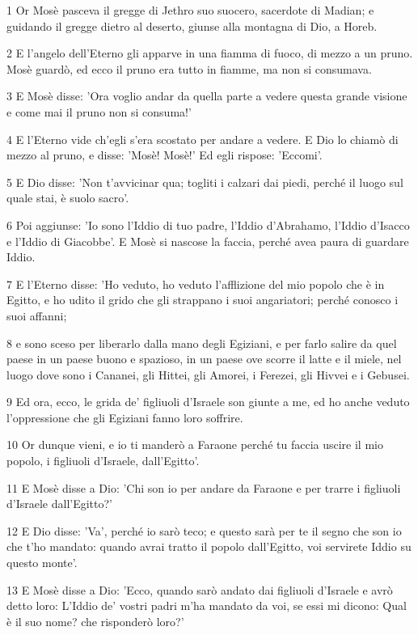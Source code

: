 \par 1 Or Mosè pasceva il gregge di Jethro suo suocero, sacerdote di Madian; e guidando il gregge dietro al deserto, giunse alla montagna di Dio, a Horeb.
\par 2 E l'angelo dell'Eterno gli apparve in una fiamma di fuoco, di mezzo a un pruno. Mosè guardò, ed ecco il pruno era tutto in fiamme, ma non si consumava.
\par 3 E Mosè disse: 'Ora voglio andar da quella parte a vedere questa grande visione e come mai il pruno non si consuma!'
\par 4 E l'Eterno vide ch'egli s'era scostato per andare a vedere. E Dio lo chiamò di mezzo al pruno, e disse: 'Mosè! Mosè!' Ed egli rispose: 'Eccomi'.
\par 5 E Dio disse: 'Non t'avvicinar qua; togliti i calzari dai piedi, perché il luogo sul quale stai, è suolo sacro'.
\par 6 Poi aggiunse: 'Io sono l'Iddio di tuo padre, l'Iddio d'Abrahamo, l'Iddio d'Isacco e l'Iddio di Giacobbe'. E Mosè si nascose la faccia, perché avea paura di guardare Iddio.
\par 7 E l'Eterno disse: 'Ho veduto, ho veduto l'afflizione del mio popolo che è in Egitto, e ho udito il grido che gli strappano i suoi angariatori; perché conosco i suoi affanni;
\par 8 e sono sceso per liberarlo dalla mano degli Egiziani, e per farlo salire da quel paese in un paese buono e spazioso, in un paese ove scorre il latte e il miele, nel luogo dove sono i Cananei, gli Hittei, gli Amorei, i Ferezei, gli Hivvei e i Gebusei.
\par 9 Ed ora, ecco, le grida de' figliuoli d'Israele son giunte a me, ed ho anche veduto l'oppressione che gli Egiziani fanno loro soffrire.
\par 10 Or dunque vieni, e io ti manderò a Faraone perché tu faccia uscire il mio popolo, i figliuoli d'Israele, dall'Egitto'.
\par 11 E Mosè disse a Dio: 'Chi son io per andare da Faraone e per trarre i figliuoli d'Israele dall'Egitto?'
\par 12 E Dio disse: 'Va', perché io sarò teco; e questo sarà per te il segno che son io che t'ho mandato: quando avrai tratto il popolo dall'Egitto, voi servirete Iddio su questo monte'.
\par 13 E Mosè disse a Dio: 'Ecco, quando sarò andato dai figliuoli d'Israele e avrò detto loro: L'Iddio de' vostri padri m'ha mandato da voi, se essi mi dicono: Qual è il suo nome? che risponderò loro?'
